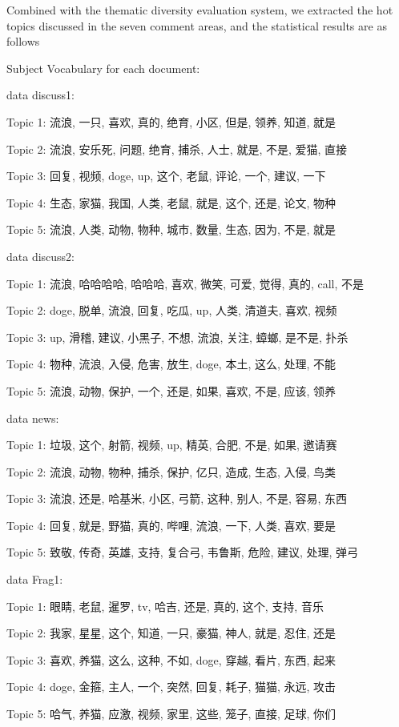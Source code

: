 \documentclass[12pt,a4paper]{ctexart}
\theoremstyle{MyLineTheoremStyle}
\theoremstyle{MyBlockTheoremStyle}
\theoremstyle{MySubsubsectionStyle}
\begin{document}
Combined with the thematic diversity evaluation system, we extracted the hot topics discussed in the seven comment areas, and the statistical results are as follows

Subject Vocabulary for each document:

data discuss1:

Topic 1: 流浪, 一只, 喜欢, 真的, 绝育, 小区, 但是, 领养, 知道, 就是

Topic 2: 流浪, 安乐死, 问题, 绝育, 捕杀, 人士, 就是, 不是, 爱猫, 直接

Topic 3: 回复, 视频, doge, up, 这个, 老鼠, 评论, 一个, 建议, 一下

Topic 4: 生态, 家猫, 我国, 人类, 老鼠, 就是, 这个, 还是, 论文, 物种

Topic 5: 流浪, 人类, 动物, 物种, 城市, 数量, 生态, 因为, 不是, 就是

data discuss2:

Topic 1: 流浪, 哈哈哈哈, 哈哈哈, 喜欢, 微笑, 可爱, 觉得, 真的, call, 不是

Topic 2: doge, 脱单, 流浪, 回复, 吃瓜, up, 人类, 清道夫, 喜欢, 视频

Topic 3: up, 滑稽, 建议, 小黑子, 不想, 流浪, 关注, 蟑螂, 是不是, 扑杀

Topic 4: 物种, 流浪, 入侵, 危害, 放生, doge, 本土, 这么, 处理, 不能

Topic 5: 流浪, 动物, 保护, 一个, 还是, 如果, 喜欢, 不是, 应该, 领养

data news:

Topic 1: 垃圾, 这个, 射箭, 视频, up, 精英, 合肥, 不是, 如果, 邀请赛

Topic 2: 流浪, 动物, 物种, 捕杀, 保护, 亿只, 造成, 生态, 入侵, 鸟类

Topic 3: 流浪, 还是, 哈基米, 小区, 弓箭, 这种, 别人, 不是, 容易, 东西

Topic 4: 回复, 就是, 野猫, 真的, 哔哩, 流浪, 一下, 人类, 喜欢, 要是

Topic 5: 致敬, 传奇, 英雄, 支持, 复合弓, 韦鲁斯, 危险, 建议, 处理, 弹弓

data Frag1:

Topic 1: 眼睛, 老鼠, 暹罗, tv, 哈吉, 还是, 真的, 这个, 支持, 音乐

Topic 2: 我家, 星星, 这个, 知道, 一只, 豪猫, 神人, 就是, 忍住, 还是

Topic 3: 喜欢, 养猫, 这么, 这种, 不如, doge, 穿越, 看片, 东西, 起来

Topic 4: doge, 金箍, 主人, 一个, 突然, 回复, 耗子, 猫猫, 永远, 攻击

Topic 5: 哈气, 养猫, 应激, 视频, 家里, 这些, 笼子, 直接, 足球, 你们
\end{document}
